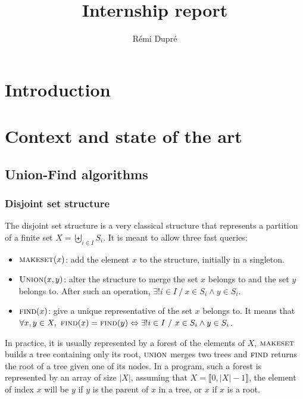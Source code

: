 \documentclass[12px]{article}
\title{Internship report}
\author{Rémi Dupré}
\begin{document}
  \maketitle

  \tableofcontents
  \pagebreak

  \section{Introduction }

  \section{Context and state of the art}
    \subsection{Union-Find algorithms}
      \subsubsection{Disjoint set structure}
        The disjoint set structure is a very classical structure that represents a partition of a finite set $X = \biguplus\limits_{i \in I} S_i$. It is meant to allow three fast queries:
        \begin{itemize}
          \item $\Call{makeset}{x}$: add the element $x$ to the structure, initially in a singleton.
          \item $\Call{Union}{x, y}$: alter the structure to merge the set $x$ belongs to and the set $y$ belongs to. After such an operation, $\exists! i \in I~/~x \in S_i \land y \in S_i$.
          \item $\Call{find}{x}$: give a unique representative of the set $x$ belongs to. It means that $\forall x, y \in X,~\Call{find}{x} = \Call{find}{y} \Leftrightarrow \exists! i \in I~/~x \in S_i \land y \in S_i$.
        \end{itemize}

        In practice, it is usually represented by a forest of the elements of $X$, $\textsc{makeset}$ builds a tree containing only its root, $\textsc{union}$ merges two trees and $\textsc{find}$ returns the root of a tree given one of its nodes.
        In a program, such a forest is represented by an array of size $|X|$, assuming that $X = \llbracket 0, |X|-1 \rrbracket$, the element of index $x$ will be $y$ if $y$ is the parent of $x$ in a tree, or $x$ if $x$ is a root.
\end{document}
